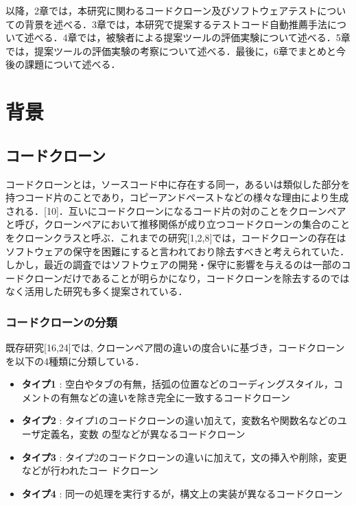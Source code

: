 \documentclass[12pt]{jarticle} %
\begin{document}
以降，2章では，本研究に関わるコードクローン及びソフトウェアテストについての背景を述べる．3章では，本研究で提案するテストコード自動推薦手法について述べる．4章では，被験者による提案ツールの評価実験について述べる．5章では，提案ツールの評価実験の考察について述べる．最後に，6章でまとめと今後の課題について述べる．


\newpage
\section{背景}
\subsection{コードクローン}

コードクローンとは，ソースコード中に存在する同一，あるいは類似した部分を持つコード片のことであり，コピーアンドペーストなどの様々な理由により生成される．[10]．互いにコードクローンになるコード片の対のことをクローンペアと呼び，クローンペアにおいて推移関係が成り立つコードクローンの集合のことをクローンクラスと呼ぶ．これまでの研究[1,2,8]では，コードクローンの存在はソフトウェアの保守を困難にすると言われており除去すべきと考えられていた．しかし，最近の調査ではソフトウェアの開発・保守に影響を与えるのは一部のコードクローンだけであることが明らかになり，コードクローンを除去するのではなく活用した研究も多く提案されている．

\subsubsection{コードクローンの分類}
既存研究[16,24]では,  クローンペア間の違いの度合いに基づき，コードクローンを以下の4種類に分類している．

\begin{itemize}
\item \textbf{タイプ1} : 空白やタブの有無，括弧の位置などのコーディングスタイル，コメントの有無などの違いを除き完全に一致するコードクローン
\item \textbf{タイプ2} : タイプ1のコードクローンの違い加えて，変数名や関数名などのユーザ定義名，変数 の型などが異なるコードクローン
\item \textbf{タイプ3} : タイプ2のコードクローンの違いに加えて，文の挿入や削除，変更などが行われたコー ドクローン
\item \textbf{タイプ4} : 同一の処理を実行するが，構文上の実装が異なるコードクローン
\end{itemize}
\end{document}
